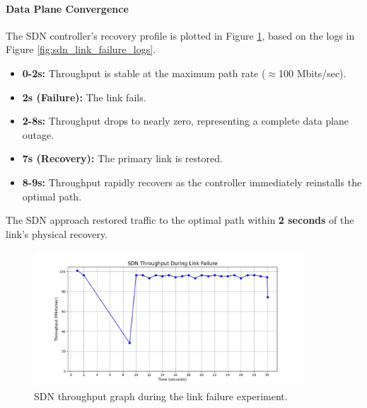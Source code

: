 \documentclass[12pt]{article}
\begin{document}
\paragraph{Data Plane Convergence}
The SDN controller's recovery profile is plotted in Figure \ref{fig:sdn_throughput_graph}, based on the logs in Figure \ref{fig:sdn_link_failure_logs}.
\begin{itemize}
    \item \textbf{0-2s:} Throughput is stable at the maximum path rate ($\approx$100 Mbits/sec).
    \item \textbf{2s (Failure):} The link fails.
    \item \textbf{2-8s:} Throughput drops to nearly zero, representing a complete data plane outage.
    \item \textbf{7s (Recovery):} The primary link is restored.
    \item \textbf{8-9s:} Throughput rapidly recovers as the controller immediately reinstalls the optimal path.
\end{itemize}
The SDN approach restored traffic to the optimal path within \textbf{2 seconds} of the link's physical recovery.

\begin{figure}[h!]
    \centering
    \includegraphics[width=0.9\textwidth]{p4_sdn_thpt_time.jpeg}
    \caption{SDN throughput graph during the link failure experiment.}
    \label{fig:sdn_throughput_graph}
\end{figure}
\end{document}
